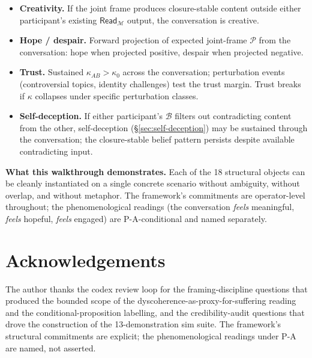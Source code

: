 \documentclass[11pt]{article}
\theoremstyle{plain}
\theoremstyle{definition}
\theoremstyle{remark}
\newcommand{\Mcal}{\mathcal{M}}
\newcommand{\Bcal}{\mathcal{B}}
\newcommand{\Pcal}{\mathcal{P}}
\begin{document}
\begin{itemize}[leftmargin=2em]
\item \textbf{Creativity.} If the joint frame produces closure-stable content outside either participant's existing $\mathsf{Read}_\Mcal$ output, the conversation is creative.

\item \textbf{Hope / despair.} Forward projection of expected joint-frame $\Pcal$ from the conversation: hope when projected positive, despair when projected negative.

\item \textbf{Trust.} Sustained $\kappa_{AB} > \kappa_0$ across the conversation; perturbation events (controversial topics, identity challenges) test the trust margin. Trust breaks if $\kappa$ collapses under specific perturbation classes.

\item \textbf{Self-deception.} If either participant's $\Bcal$ filters out contradicting content from the other, self-deception (\S\ref{sec:self-deception}) may be sustained through the conversation; the closure-stable belief pattern persists despite available contradicting input.
\end{itemize}

\textbf{What this walkthrough demonstrates.} Each of the 18 structural objects can be cleanly instantiated on a single concrete scenario without ambiguity, without overlap, and without metaphor. The framework's commitments are operator-level throughout; the phenomenological readings (the conversation \emph{feels} meaningful, \emph{feels} hopeful, \emph{feels} engaged) are P-A-conditional and named separately.

\section*{Acknowledgements}

The author thanks the codex review loop for the framing-discipline questions that produced the bounded scope of the dyscoherence-as-proxy-for-suffering reading and the conditional-proposition labelling, and the credibility-audit questions that drove the construction of the 13-demonstration sim suite. The framework's structural commitments are explicit; the phenomenological readings under P-A are named, not asserted.



\end{document}
